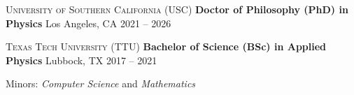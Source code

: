 
\begin{cventries}
  \cventry
  {\textsc{University of Southern California} (USC)}
  { \textbf{Doctor of Philosophy (PhD) in Physics} }
    {Los Angeles, CA}
    {2021 -- 2026}
    {
      \begin{cvitems}
      \end{cvitems}
      \vspace{1em}
    }

  \cventry
  {\textsc{Texas Tech University} (TTU)}
  { \textbf{Bachelor of Science (BSc) in Applied Physics} }
    {Lubbock, TX}
    {2017 -- 2021}
    {
      \begin{cvitems}
      \item{Minors: \textit{Computer Science} and  \textit{Mathematics}}
      \end{cvitems}
      \vspace{1em}
    }
\end{cventries}
